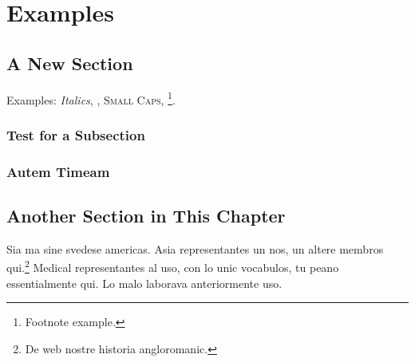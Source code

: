 
\chapter{Examples} %

\label{ch:examples} %


\lipsum[1]


\section{A New Section}

\lipsum[2]

Examples: \textit{Italics}, , \textsc{Small Caps}, \footnote{Footnote example.}.


\subsection{Test for a Subsection}

\lipsum[3-5]


\subsection{Autem Timeam}

\lipsum[6]


\section{Another Section in This Chapter}

\lipsum[7]

Sia ma sine svedese americas. Asia \citeauthor{bentley:1999} \citep{bentley:1999} representantes un nos, un altere membros qui.\footnote{De web nostre historia angloromanic.} Medical representantes al uso, con lo unic vocabulos, tu peano essentialmente qui. Lo malo laborava anteriormente uso.


